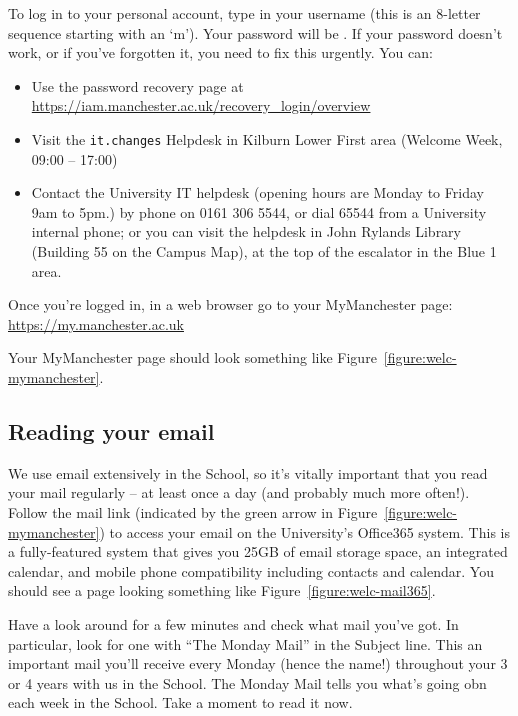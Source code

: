 To log in to your personal account, type in your username (this is an
8-letter sequence starting with an `m'). Your password will
be \splunge. If your password doesn't work, or if you've forgotten it,
you need to fix this urgently. You can:

\begin{itemize}
\item Use the password recovery page at\\ \url{https://iam.manchester.ac.uk/recovery_login/overview}
\item Visit the \verb|it.changes| Helpdesk in Kilburn Lower First area (Welcome Week, 09:00 -- 17:00)
\item Contact the University IT helpdesk (opening hours are Monday to Friday 9am to 5pm.) by phone on 0161 306 5544, or dial 65544 from a University internal phone; or you can visit the helpdesk in John Rylands Library (Building 55 on
the Campus Map), at the top of the escalator in the Blue 1 area.
\end{itemize}

Once you're logged in, in a web browser go to your MyManchester page:\\ \url{https://my.manchester.ac.uk}

Your MyManchester page should look something like
Figure~\ref{figure:welc-mymanchester}.

\subsection{Reading your email}

We use email extensively in the School, so it's vitally important that
you read your mail regularly -- at least once a day (and probably much
more often!). Follow the mail link (indicated by the green arrow in
Figure~\ref{figure:welc-mymanchester}) to access your email on the
University's Office365 system. This is a fully-featured system that
gives you 25GB of email storage space, an integrated calendar, and
mobile phone compatibility including contacts and calendar. You should
see a page looking something like Figure~\ref{figure:welc-mail365}.

Have a look around for a few minutes and check what mail you've
got. In particular, look for one with ``The Monday Mail'' in the
Subject line. This an important mail you'll receive every Monday
(hence the name!) throughout your 3 or 4 years with us in the
School. The Monday Mail tells you what's going obn each week in the
School. Take a moment to read it now.

